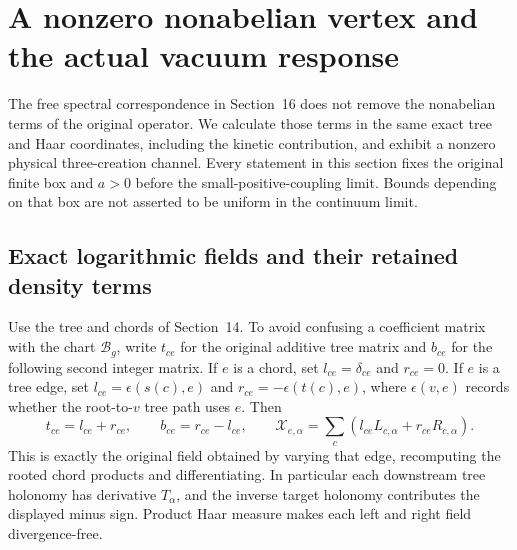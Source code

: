 \section{A nonzero nonabelian vertex and the actual vacuum response}
\label{sec:nonabelian-vertex}

The free spectral correspondence in Section~16 does not remove the
nonabelian terms of the original operator. We calculate those terms
in the same exact tree and Haar coordinates, including the kinetic
contribution, and exhibit a nonzero physical three-creation channel.
Every statement in this section fixes the original finite box and
$a>0$ before the small-positive-coupling limit. Bounds depending on
that box are not asserted to be uniform in the continuum limit.

\subsection{Exact logarithmic fields and their retained density terms}

Use the tree and chords of Section~14. To avoid confusing a coefficient
matrix with the chart $\mathcal B_g$, write $t_{ce}$ for the original
additive tree matrix and $b_{ce}$ for the following second integer
matrix. If $e$ is a chord, set
$l_{ce}=\delta_{ce}$ and $r_{ce}=0$. If $e$ is a tree edge, set
$l_{ce}=\epsilon(s(c),e)$ and $r_{ce}=-\epsilon(t(c),e)$, where
$\epsilon(v,e)$ records whether the root-to-$v$ tree path uses $e$.
Then
\begin{equation}\label{eq:vertex-integer-matrices}
 t_{ce}=l_{ce}+r_{ce},\qquad b_{ce}=r_{ce}-l_{ce},\qquad
 \mathcal X_{e,\alpha}=
       \sum_c(l_{ce}L_{c,\alpha}+r_{ce}R_{c,\alpha}).
\end{equation}
This is exactly the original field obtained by varying that edge,
recomputing the rooted chord products and differentiating. In particular
each downstream tree holonomy has derivative $T_\alpha$, and the
inverse target holonomy contributes the displayed minus sign. Product
Haar measure makes each left and right field divergence-free.

